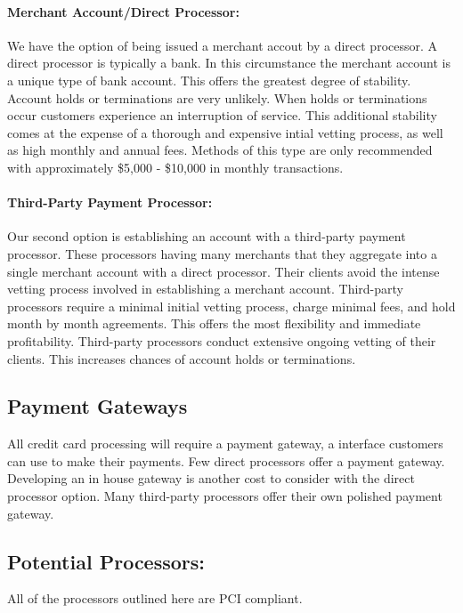 \documentclass[letterpaper]{article}
\begin{document}
      \paragraph{Merchant Account/Direct Processor:}
        We have the option of being issued a merchant accout by a direct processor. A direct processor
        is typically a bank. In this circumstance the merchant account is a unique type of bank account.
        This offers the greatest degree of stability. Account holds or terminations are very unlikely.
        When holds or terminations occur customers experience an interruption of service.
        This additional stability comes at the expense of a thorough and expensive intial vetting process, as well
        as high monthly and annual fees. Methods of this type are only recommended with approximately \$5,000 - \$10,000
        in monthly transactions.
      \paragraph{Third-Party Payment Processor:}
        Our second option is establishing an account with a third-party payment processor. These processors having many
        merchants that they aggregate into a single merchant account with a direct processor. Their clients avoid
        the intense vetting process involved in establishing a merchant account. Third-party processors require a minimal initial vetting process,
        charge minimal fees, and hold month by month agreements. This offers the most flexibility and immediate profitability. Third-party processors conduct
        extensive ongoing vetting of their clients. This increases chances of account holds or terminations.
    \subsection{Payment Gateways}
        All credit card processing will require a payment gateway, a interface customers can use to make their payments.
        Few direct processors offer a payment gateway. Developing an in house gateway is another cost to consider with the direct processor option.
        Many third-party processors offer their own polished payment gateway.
    \subsection{Potential Processors:}
      All of the processors outlined here are PCI compliant.
\end{document}
